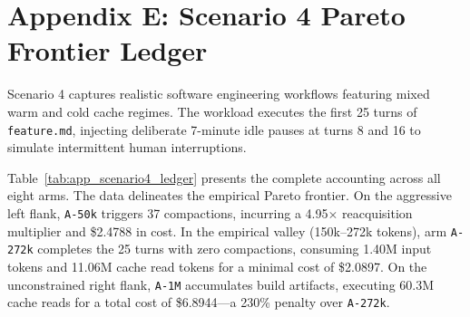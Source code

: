 \documentclass[10pt,twocolumn,a4paper]{article}
\begin{document}
\clearpage
\section*{Appendix E: Scenario 4 Pareto Frontier Ledger}

Scenario 4 captures realistic software engineering workflows featuring mixed warm and cold cache regimes. The workload executes the first 25 turns of \texttt{feature.md}, injecting deliberate 7-minute idle pauses at turns 8 and 16 to simulate intermittent human interruptions.

Table~\ref{tab:app_scenario4_ledger} presents the complete accounting across all eight arms. The data delineates the empirical Pareto frontier. On the aggressive left flank, \texttt{A-50k} triggers 37 compactions, incurring a 4.95$\times$ reacquisition multiplier and \$2.4788 in cost. In the empirical valley (150k--272k tokens), arm \texttt{A-272k} completes the 25 turns with zero compactions, consuming 1.40M input tokens and 11.06M cache read tokens for a minimal cost of \$2.0897. On the unconstrained right flank, \texttt{A-1M} accumulates build artifacts, executing 60.3M cache reads for a total cost of \$6.8944—a 230\% penalty over \texttt{A-272k}.
\end{document}
